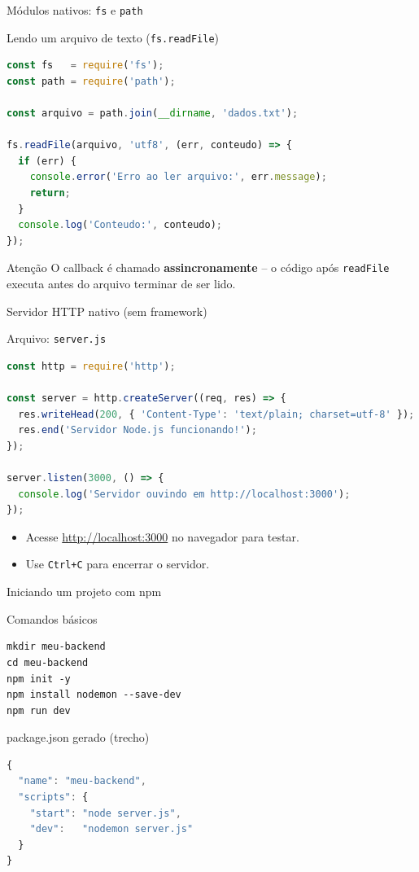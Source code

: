 \documentclass[aspectratio=169]{beamer}
\newcommand{\code}[1]{\texttt{#1}}
\begin{document}
\begin{frame}[fragile]{M\'odulos nativos: \code{fs} e \code{path}}
\begin{block}{Lendo um arquivo de texto (\code{fs.readFile})}
\begin{lstlisting}[language=JavaScript]
const fs   = require('fs');
const path = require('path');

const arquivo = path.join(__dirname, 'dados.txt');

fs.readFile(arquivo, 'utf8', (err, conteudo) => {
  if (err) {
    console.error('Erro ao ler arquivo:', err.message);
    return;
  }
  console.log('Conteudo:', conteudo);
});
\end{lstlisting}
\end{block}
\begin{alertblock}{Aten\c{c}\~ao}
O callback \'{e} chamado \textbf{assincronamente} -- o c\'odigo ap\'os \code{readFile} executa antes do arquivo terminar de ser lido.
\end{alertblock}
\end{frame}

\begin{frame}[fragile]{Servidor HTTP nativo (sem framework)}
\begin{block}{Arquivo: \code{server.js}}
\begin{lstlisting}[language=JavaScript]
const http = require('http');

const server = http.createServer((req, res) => {
  res.writeHead(200, { 'Content-Type': 'text/plain; charset=utf-8' });
  res.end('Servidor Node.js funcionando!');
});

server.listen(3000, () => {
  console.log('Servidor ouvindo em http://localhost:3000');
});
\end{lstlisting}
\end{block}
\begin{itemize}
  \item Acesse \url{http://localhost:3000} no navegador para testar.
  \item Use \code{Ctrl+C} para encerrar o servidor.
\end{itemize}
\end{frame}

\begin{frame}[fragile]{Iniciando um projeto com npm}
\begin{block}{Comandos b\'asicos}
\begin{lstlisting}
mkdir meu-backend
cd meu-backend
npm init -y
npm install nodemon --save-dev
npm run dev
\end{lstlisting}
\end{block}
\begin{block}{package.json gerado (trecho)}
\begin{lstlisting}[language=JavaScript]
{
  "name": "meu-backend",
  "scripts": {
    "start": "node server.js",
    "dev":   "nodemon server.js"
  }
}
\end{lstlisting}
\end{block}
\end{frame}
\end{document}
